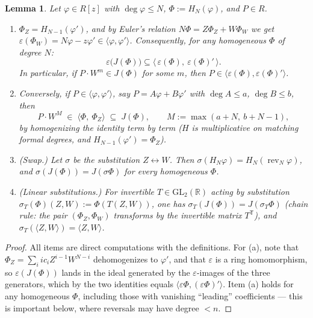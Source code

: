 \documentclass[11pt,a4paper]{article}
\newtheorem{lemma}[theorem]{Lemma}
\theoremstyle{definition}
\newcommand{\R}{\mathbb{R}}
\newcommand{\rev}{\operatorname{rev}}
\newcommand{\ideal}[1]{\langle #1\rangle}
\begin{document}
\begin{lemma}\label{lem:homog}
Let $\varphi \in R[z]$ with $\deg \varphi \leq N$, $\Phi := H_N(\varphi)$, and
$P \in R$.
\begin{enumerate}[label=(\alph*)]
\item $\Phi_Z = H_{N-1}(\varphi')$, and by Euler's relation
  $N\Phi = Z\Phi_Z + W\Phi_W$ we get
  $\varepsilon(\Phi_W) = N\varphi - z\varphi' \in \ideal{\varphi,\varphi'}$.
  Consequently, for \emph{any} homogeneous $\Phi$ of degree $N$:
  \[
    \varepsilon\bigl(J(\Phi)\bigr) \subseteq
       \ideal{\,\varepsilon(\Phi),\ \varepsilon(\Phi)'\,}.
  \]
  In particular, if $P\cdot W^m \in J(\Phi)$ for some $m$, then
  $P \in \ideal{\varepsilon(\Phi), \varepsilon(\Phi)'}$.
\item Conversely, if $P \in \ideal{\varphi, \varphi'}$, say
  $P = A\varphi + B\varphi'$ with $\deg A \le a$, $\deg B \le b$, then
  \[
    P\cdot W^{M} \;\in\; \ideal{\Phi,\ \Phi_Z}\;\subseteq\;J(\Phi),
    \qquad M := \max(a+N,\ b+N-1),
  \]
  by homogenizing the identity term by term
  ($H$ is multiplicative on matching formal degrees, and
  $H_{N-1}(\varphi') = \Phi_Z$).
\item (Swap.) Let $\sigma$ be the substitution $Z \leftrightarrow W$. Then
  $\sigma(H_N \varphi) = H_N(\rev_N \varphi)$, and
  $\sigma(J(\Phi)) = J(\sigma\Phi)$ for every homogeneous $\Phi$.
\item (Linear substitutions.) For invertible
  $T \in \mathrm{GL}_2(\R)$ acting by substitution
  $\sigma_T(\Phi)(Z,W) := \Phi(T(Z,W))$, one has
  $\sigma_T(J(\Phi)) = J(\sigma_T\Phi)$ (chain rule: the pair
  $(\Phi_Z,\Phi_W)$ transforms by the invertible matrix $T^{\mathsf T}$),
  and $\sigma_T(\ideal{Z,W}) = \ideal{Z,W}$.
\end{enumerate}
\end{lemma}

\begin{proof}
All items are direct computations with the definitions. For (a), note that
$\Phi_Z = \sum_i i c_i Z^{i-1}W^{N-i}$ dehomogenizes to $\varphi'$, and
that $\varepsilon$ is a ring homomorphism, so $\varepsilon(J(\Phi))$ lands in
the ideal generated by the $\varepsilon$-images of the three generators, which
by the two identities equals
$\ideal{\varepsilon\Phi, (\varepsilon\Phi)'}$. Item (a) holds for
any homogeneous $\Phi$, including those with vanishing ``leading''
coefficients --- this is important below, where reversals may have degree
$< n$.
\end{proof}
\end{document}
